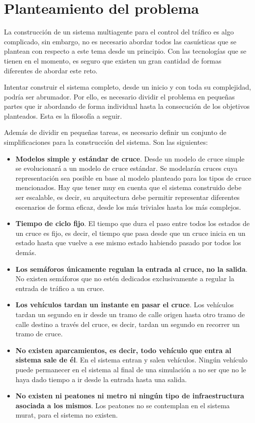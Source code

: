 \newpage
\section{Planteamiento del problema}
%
%
    \label{section:problem}
La construcción de un sistema multiagente para el control del tráfico es algo complicado, sin embargo, no es necesario abordar todos las casuísticas que se plantean con respecto a este tema desde un principio. Con las tecnologías que se tienen en el momento, es seguro que existen un gran cantidad de formas diferentes de abordar este reto.

Intentar construir el sistema completo, desde un inicio y con toda su complejidad, podría ser abrumador. Por ello, es necesario dividir el problema en pequeñas partes que ir abordando de forma individual hasta la consecución de los objetivos planteados. Esta es la filosofía a seguir.

Además de dividir en pequeñas tareas, es necesario definir un conjunto de simplificaciones para la construcción del sistema. Son las siguientes:
\begin{itemize}
    \item \textbf{Modelos simple y estándar de cruce}. Desde un modelo de cruce simple se evolucionará a un modelo de cruce estándar. Se modelarán cruces cuya representación sea posible en base al modelo planteado para los tipos de cruce mencionados. Hay que tener muy en cuenta que el sistema construido debe ser escalable, es decir, su arquitectura debe permitir representar diferentes escenarios de forma eficaz, desde los más triviales hasta los más complejos.
    \item \textbf{Tiempo de ciclo fijo}. El tiempo que dura el paso entre todos los estados de un cruce es fijo, es decir, el tiempo que pasa desde que un cruce inicia en un estado hasta que vuelve a ese mismo estado habiendo pasado por todos los demás.
    \item \textbf{Los semáforos únicamente regulan la entrada al cruce, no la salida}. No existen semáforos que no estén dedicados exclusivamente a regular la entrada de tráfico a un cruce.
    \item \textbf{Los vehículos tardan un instante en pasar el cruce}. Los vehículos tardan un segundo en ir desde un tramo de calle origen hasta otro tramo de calle destino a través del cruce, es decir, tardan un segundo en recorrer un tramo de cruce.
    \item \textbf{No existen aparcamientos, es decir, todo vehículo que entra al sistema sale de él}. En el sistema entran y salen vehículos. Ningún vehículo puede permanecer en el sistema al final de una simulación a no ser que no le haya dado tiempo a ir desde la entrada hasta una salida.
    \item \textbf{No existen ni peatones ni metro ni ningún tipo de infraestructura asociada a los mismos}. Los peatones no se contemplan en el sistema \acrshort{murat}, para el sistema no existen.
\end{itemize}

